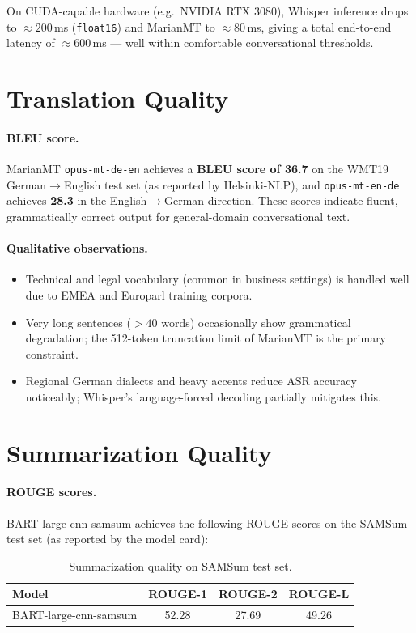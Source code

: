 \documentclass[12pt,a4paper]{report}
\begin{document}
On CUDA-capable hardware (e.g.\ NVIDIA RTX 3080), Whisper inference
drops to $\approx 200$\,ms (\texttt{float16}) and MarianMT to
$\approx 80$\,ms, giving a total end-to-end latency of
$\approx 600$\,ms — well within comfortable conversational thresholds.

\section{Translation Quality}

\paragraph{BLEU score.}
MarianMT \texttt{opus-mt-de-en} achieves a \textbf{BLEU score of 36.7}
on the WMT19 German$\to$English test set (as reported by Helsinki-NLP),
and \texttt{opus-mt-en-de} achieves \textbf{28.3} in the
English$\to$German direction. These scores indicate fluent,
grammatically correct output for general-domain conversational text.

\paragraph{Qualitative observations.}
\begin{itemize}
  \item Technical and legal vocabulary (common in business settings)
        is handled well due to EMEA and Europarl training corpora.
  \item Very long sentences ($> 40$ words) occasionally show
        grammatical degradation; the 512-token truncation limit of
        MarianMT is the primary constraint.
  \item Regional German dialects and heavy accents reduce ASR accuracy
        noticeably; Whisper's language-forced decoding partially
        mitigates this.
\end{itemize}

\section{Summarization Quality}

\paragraph{ROUGE scores.}
BART-large-cnn-samsum achieves the following ROUGE scores on the SAMSum
test set (as reported by the model card):

\begin{table}[H]
  \centering
  \begin{tabular}{lccc}
    \toprule
    \textbf{Model} & \textbf{ROUGE-1} & \textbf{ROUGE-2} & \textbf{ROUGE-L} \\
    \midrule
    BART-large-cnn-samsum & 52.28 & 27.69 & 49.26 \\
    \bottomrule
  \end{tabular}
  \caption{Summarization quality on SAMSum test set.}
\end{table}
\end{document}
